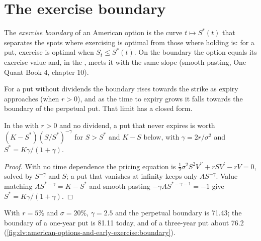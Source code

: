 \section{The exercise boundary}

\begin{definition}\label{def:dv:american-options-and-early-exercise:boundary}
The \emph{exercise boundary} of an American option is the curve
$t\mapsto S^*(t)$ that separates the spots where exercising is optimal from those where
holding is: for a put, exercise is optimal when $S_t\le S^*(t)$. On the boundary the
option equals its exercise value and, in the , meets it with the same
slope (smooth pasting, One Quant Book 4, chapter 10).
\end{definition}

For a put without dividends the boundary rises towards the strike as expiry approaches
(when $r>0$), and as the time to expiry grows it falls towards the boundary of the
perpetual put. That limit has a closed form.

\begin{proposition}\label{prop:dv:american-options-and-early-exercise:perpetual}
In the  with $r>0$ and no dividend, a put that never expires is worth
$(K-S^*)(S/S^*)^{-\gamma}$ for $S>S^*$ and $K-S$ below, with $\gamma=2r/\sigma^2$ and
$S^*=K\gamma/(1+\gamma)$.
\end{proposition}
\begin{proof}
With no time dependence the pricing equation is $\tfrac12\sigma^2S^2V^{\prime\prime}+rSV^{\prime}-rV=0$,
solved by $S^{-\gamma}$ and $S$; a put that vanishes at infinity keeps only $AS^{-\gamma}$.
Value matching $AS^{*-\gamma}=K-S^*$ and smooth pasting $-\gamma AS^{*-\gamma-1}=-1$ give
$S^*=K\gamma/(1+\gamma)$.
\end{proof}

With $r=5\%$ and $\sigma=20\%$, $\gamma=2.5$ and the perpetual boundary is 71.43; the
boundary of a one-year put is 81.11 today, and of a three-year put about 76.2
(\cref{fig:dv:american-options-and-early-exercise:boundary}).

